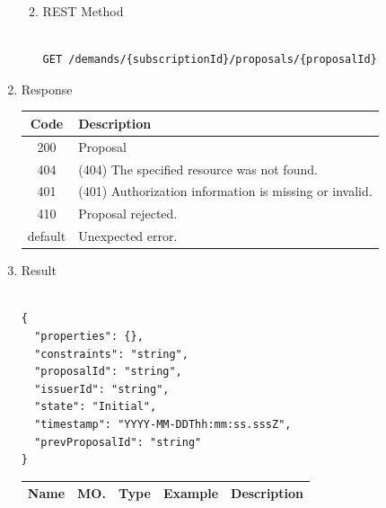 \begin{enumerate}
\begin{enumerate}
\begin{center}
\begin{tabular}{|p{3cm}|l|p{3cm}|p{3cm}|p{4cm}|}
\end{tabular}
\end{center}

\item REST Method

\begin{tcolorbox}[boxrule=0pt, frame empty]
\begin{verbatim} 

GET /demands/{subscriptionId}/proposals/{proposalId}

\end{verbatim}
\end{tcolorbox}

\end{enumerate}

\item Response

\begin{center}
\begin{tabular}{|c|l|} 
\hline
\rowcolor{lightgray}	Code 		& 	Description \\
\hline
200	 		&	Proposal  \\
\hline
404			&	(404) The specified resource was not found. \\
\hline
401			&	(401) Authorization information is missing or invalid. \\
\hline
410			&	Proposal rejected. \\
\hline
default		&	Unexpected error. \\
\hline
\end{tabular}
\end{center}


\item Result

\begin{tcolorbox}[boxrule=0pt, frame empty]
\begin{verbatim}

{
  "properties": {},
  "constraints": "string",
  "proposalId": "string",
  "issuerId": "string",
  "state": "Initial",
  "timestamp": "YYYY-MM-DDThh:mm:ss.sssZ",
  "prevProposalId": "string"
}

\end{verbatim}
\end{tcolorbox}

\begin{center}
\begin{tabular}{|p{3cm}|l|p{3cm}|p{3cm}|p{4cm}|} 
\hline
\rowcolor{lightgray}	Name	& MO.	& Type	& Example & 	Description \\
\hline


\end{tabular}
\end{center}
\end{enumerate}
